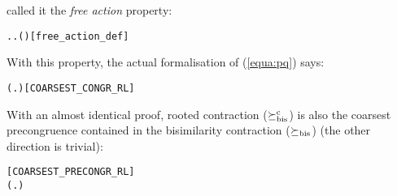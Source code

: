  called it the \emph{free action} property:
\begin{alltt}
  \HOLSymConst{\HOLTokenEquiv{}} \HOLSymConst{\HOLTokenExists{}}. \HOLSymConst{\HOLTokenForall{}}. \HOLSymConst{\HOLTokenNeg{}}( \HOLTokenWeakTransBegin{} \HOLTokenWeakTransEnd {})\hfill{[free_action_def]}
\end{alltt}
%
With this property, the actual formalisation of (\ref{equa:pq}) says:
\begin{alltt}
\HOLTokenTurnstile{}   \HOLSymConst{\HOLTokenConj{}}   \HOLSymConst{\HOLTokenImp{}} (\HOLSymConst{\HOLTokenForall{}}.  \HOLSymConst{\ensuremath{+}}  \HOLSymConst{\HOLTokenWeakEQ}  \HOLSymConst{\ensuremath{+}} ) \HOLSymConst{\HOLTokenImp{}}  \HOLSymConst{\HOLTokenObsCongr} \hfill{[COARSEST_CONGR_RL]}
\end{alltt}

With an almost identical proof, rooted contraction
($\mathrel{\succeq^{\rm{c}}_{\rm{bis}}}$) is also the coarsest
precongruence contained in the bisimilarity contraction ($\mathrel{\succeq_{\rm{bis}}}$)
(the other direction is trivial):
\vspace{-2ex}
\begin{alltt}
\hfill{[COARSEST_PRECONGR_RL]}
\HOLTokenTurnstile{}   \HOLSymConst{\HOLTokenConj{}}   \HOLSymConst{\HOLTokenImp{}} (\HOLSymConst{\HOLTokenForall{}}.  \HOLSymConst{\ensuremath{+}}  \HOLSymConst{\HOLTokenContracts{}}  \HOLSymConst{\ensuremath{+}} ) \HOLSymConst{\HOLTokenImp{}}  \HOLSymConst{\HOLTokenObsContracts} 
\end{alltt}

